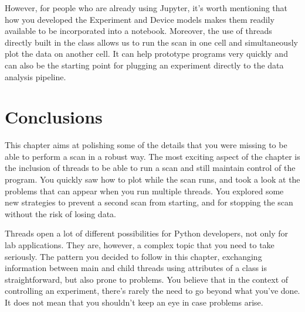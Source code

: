 However, for people who are already using Jupyter, it's worth mentioning that how you developed the Experiment and Device models makes them readily available to be incorporated into a notebook. Moreover, the use of threads directly built in the class allows us to run the scan in one cell and simultaneously plot the data on another cell. It can help prototype programs very quickly and can also be the starting point for plugging an experiment directly to the data analysis pipeline.

\section{Conclusions}\label{sec:conclusions-run-experiment}
This chapter aims at polishing some of the details that you were missing to be able to perform a scan in a robust way. The most exciting aspect of the chapter is the inclusion of threads to be able to run a scan and still maintain control of the program. You quickly saw how to plot while the scan runs, and took a look at the problems that can appear when you run multiple threads. You explored some new strategies to prevent a second scan from starting, and for stopping the scan without the risk of losing data.

Threads open a lot of different possibilities for Python developers, not only for lab applications. They are, however, a complex topic that you need to take seriously. The pattern you decided to follow in this chapter, exchanging information between main and child threads using attributes of a class is straightforward, but also prone to problems. You believe that in the context of controlling an experiment, there's rarely the need to go beyond what you've done. It does not mean that you shouldn't keep an eye in case problems arise.
